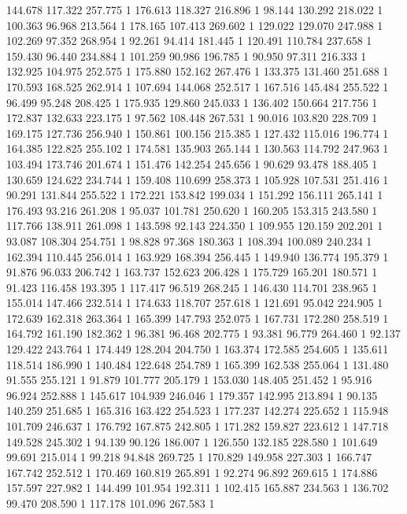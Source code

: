	144.678	117.322	257.775	1
	176.613	118.327	216.896	1
	98.144	130.292	218.022	1
	100.363	96.968	213.564	1
	178.165	107.413	269.602	1
	129.022	129.070	247.988	1
	102.269	97.352	268.954	1
	92.261	94.414	181.445	1
	120.491	110.784	237.658	1
	159.430	96.440	234.884	1
	101.259	90.986	196.785	1
	90.950	97.311	216.333	1
	132.925	104.975	252.575	1
	175.880	152.162	267.476	1
	133.375	131.460	251.688	1
	170.593	168.525	262.914	1
	107.694	144.068	252.517	1
	167.516	145.484	255.522	1
	96.499	95.248	208.425	1
	175.935	129.860	245.033	1
	136.402	150.664	217.756	1
	172.837	132.633	223.175	1
	97.562	108.448	267.531	1
	90.016	103.820	228.709	1
	169.175	127.736	256.940	1
	150.861	100.156	215.385	1
	127.432	115.016	196.774	1
	164.385	122.825	255.102	1
	174.581	135.903	265.144	1
	130.563	114.792	247.963	1
	103.494	173.746	201.674	1
	151.476	142.254	245.656	1
	90.629	93.478	188.405	1
	130.659	124.622	234.744	1
	159.408	110.699	258.373	1
	105.928	107.531	251.416	1
	90.291	131.844	255.522	1
	172.221	153.842	199.034	1
	151.292	156.111	265.141	1
	176.493	93.216	261.208	1
	95.037	101.781	250.620	1
	160.205	153.315	243.580	1
	117.766	138.911	261.098	1
	143.598	92.143	224.350	1
	109.955	120.159	202.201	1
	93.087	108.304	254.751	1
	98.828	97.368	180.363	1
	108.394	100.089	240.234	1
	162.394	110.445	256.014	1
	163.929	168.394	256.445	1
	149.940	136.774	195.379	1
	91.876	96.033	206.742	1
	163.737	152.623	206.428	1
	175.729	165.201	180.571	1
	91.423	116.458	193.395	1
	117.417	96.519	268.245	1
	146.430	114.701	238.965	1
	155.014	147.466	232.514	1
	174.633	118.707	257.618	1
	121.691	95.042	224.905	1
	172.639	162.318	263.364	1
	165.399	147.793	252.075	1
	167.731	172.280	258.519	1
	164.792	161.190	182.362	1
	96.381	96.468	202.775	1
	93.381	96.779	264.460	1
	92.137	129.422	243.764	1
	174.449	128.204	204.750	1
	163.374	172.585	254.605	1
	135.611	118.514	186.990	1
	140.484	122.648	254.789	1
	165.399	162.538	255.064	1
	131.480	91.555	255.121	1
	91.879	101.777	205.179	1
	153.030	148.405	251.452	1
	95.916	96.924	252.888	1
	145.617	104.939	246.046	1
	179.357	142.995	213.894	1
	90.135	140.259	251.685	1
	165.316	163.422	254.523	1
	177.237	142.274	225.652	1
	115.948	101.709	246.637	1
	176.792	167.875	242.805	1
	171.282	159.827	223.612	1
	147.718	149.528	245.302	1
	94.139	90.126	186.007	1
	126.550	132.185	228.580	1
	101.649	99.691	215.014	1
	99.218	94.848	269.725	1
	170.829	149.958	227.303	1
	166.747	167.742	252.512	1
	170.469	160.819	265.891	1
	92.274	96.892	269.615	1
	174.886	157.597	227.982	1
	144.499	101.954	192.311	1
	102.415	165.887	234.563	1
	136.702	99.470	208.590	1
	117.178	101.096	267.583	1
